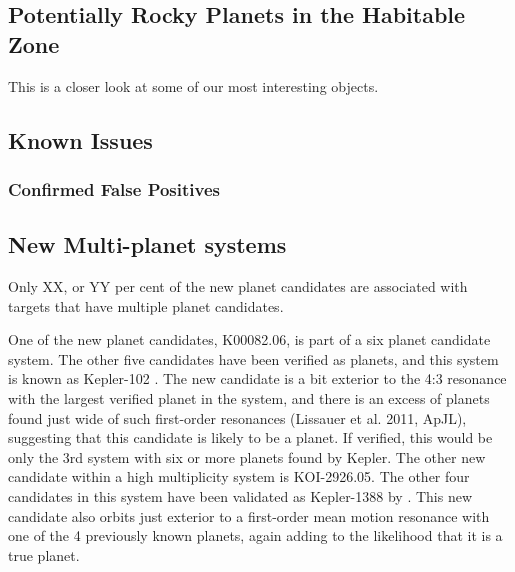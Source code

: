 

\subsection{Potentially Rocky Planets in the Habitable Zone}
This is a closer look at some of our most interesting objects.
\subsection{Known Issues}
\subsubsection{Confirmed False Positives}



\subsection{New Multi-planet systems}
Only XX, or YY per cent of the new planet candidates are associated with targets that have multiple planet candidates. 

One of the new planet candidates, K00082.06, is part of a six planet candidate system.  The other five candidates have been verified as planets, and this system is known as Kepler-102 \citep{Marcy2014,Rowe2014}.  The new candidate is a bit exterior to the 4:3 resonance with the largest verified planet in the system, and there is an excess of planets found just wide of such first-order resonances (Lissauer et al. 2011, ApJL), suggesting that this candidate is likely to be a planet.  If verified, this would be only the 3rd system with six or more planets found by Kepler. 
The other new candidate within a high multiplicity system is KOI-2926.05.  The other four candidates in this system have been validated as Kepler-1388 by \citet{Morton2016}.  This new candidate also orbits just exterior to a first-order mean motion resonance with one of the 4 previously known planets, again adding to the likelihood that it is a true planet. 

